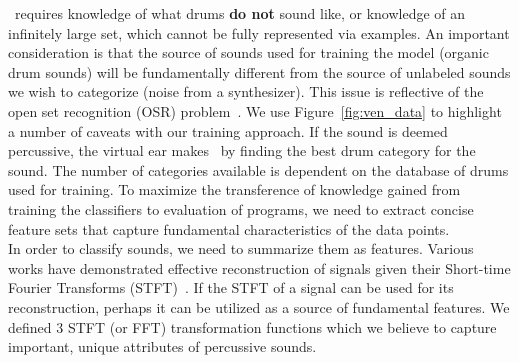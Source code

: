 \documentclass[runningheads,a4paper]{llncs}
\begin{document}
\decfirst~requires knowledge of what drums \textbf{do not} sound like, or knowledge of an infinitely large set, which cannot be fully represented via examples. An important consideration is that the source of sounds used for training the model (organic drum sounds) will be fundamentally different from the source of unlabeled sounds we wish to categorize (noise from a synthesizer). This issue is reflective of the open set recognition (OSR) problem~\cite{geng2020recent,mundt2019open}. We use Figure~\ref{fig:ven_data} to highlight a number of caveats with our training approach. If the sound is deemed percussive, the virtual ear makes \decsecond~by finding the best drum category for the sound. The number of categories available is dependent on the database of drums used for training. 
To maximize the transference of knowledge gained from training the classifiers to evaluation of programs, we need to extract concise feature sets that capture fundamental characteristics of the data points.\\

In order to classify sounds, we need to summarize them as features. Various works have demonstrated effective reconstruction of signals given their Short-time Fourier Transforms (STFT)~\cite{nawab1983signal,griffin1984signal}. If the STFT of a signal can be used for its reconstruction, perhaps it can be utilized as a source of fundamental features. We defined 3 STFT (or FFT) transformation functions which we believe to capture important, unique attributes of percussive sounds. 
\end{document}
